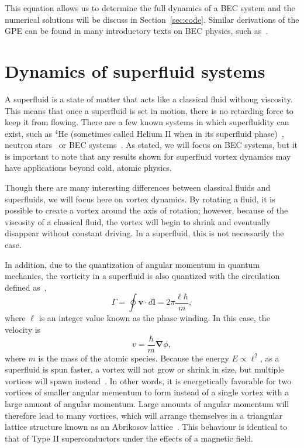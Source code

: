 This equation allows us to determine the full dynamics of a BEC system and the numerical solutions will be discuss in Section~\ref{sec:code}. Similar derivations of the GPE can be found in many introductory texts on BEC physics, such as~\cite{Fetter2003,  Pethick2002, Fetter2009}.

\section{Dynamics of superfluid systems}
\label{sec"superfluid}

A superfluid is a state of matter that acts like a classical fluid withoug viscosity.
This means that once a superfluid is set in motion, there is no retarding force to keep it from flowing.
There are a few known systems in which superfluidity can exist, such as $^4$He (sometimes called Helium II when in its superfluid phase)~\cite{Allen1938}, neutron stars~\cite{Migdal1960} or BEC systems~\cite{Einstein1925, Anderson1995}.
As stated, we will focus on BEC systems, but it is important to note that any results shown for superfluid vortex dynamics may have applications beyond cold, atomic physics.

Though there are many interesting differences between classical fluids and superfluids, we will focus here on vortex dynamics.
By rotating a fluid, it is possible to create a vortex around the axis of rotation; however, because of the viscosity of a classical fluid, the vortex will begin to shrink and eventually disappear without constant driving.
In a superfluid, this is not necessarily the case.

In addition, due to the quantization of angular momentum in quantum mechanics, the vorticity in a superfluid is also quantized with the circulation defined as~\cite{Pethick2002},
\begin{equation}
\Gamma = \oint\mathbf{v} \cdot d \mathbf{l} = 2\pi \frac{\ell \hbar}{m},
\label{Eq:phase}
\end{equation}
where $\ell$ is an integer value known as the phase winding.
In this case, the velocity is
\begin{equation}
v = \frac{\hbar}{m}\mathbf{\nabla}\phi,
\end{equation}
where $m$ is the mass of the atomic species.
Because the energy $E \propto \ell^2$, as a superfluid is spun faster, a vortex will not grow or shrink in size, but multiple vortices will spawn instead~\cite{Pethick2002}.
In other words, it is energetically favorable for two vortices of smaller angular mementum to form instead of a single vortex with a large amuont of angular momentum.
Large amounts of angular momentum will therefore lead to many vortices, which will arrange themselves in a triangular lattice structure known as an Abrikosov lattice~\cite{Abrikosov1957, Fetter2001}.
This behaviour is identical to that of Type II superconductors under the effects of a magnetic field.

